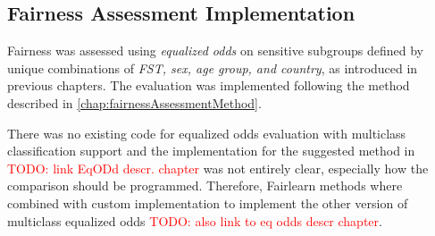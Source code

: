 \documentclass[12pt, a4paper, oneside]{book}   	%
\renewcommand{\todo}[1]{\textcolor{red}{TODO: #1}}
\begin{document}
		
		\subsection{Fairness Assessment Implementation} \label{chap:fairnessAssessmentImpementation}
		Fairness was assessed using \textit{equalized odds} on sensitive subgroups defined by unique combinations of \textit{\gls{FST}, sex, age group, and country}, as introduced in previous chapters. The evaluation was implemented following the method described in \autoref{chap:fairnessAssessmentMethod}.
		
		There was no existing code for equalized odds evaluation with multiclass classification support and the implementation for the suggested method in \todo{link EqODd descr. chapter} was not entirely clear, especially how the comparison should be programmed. Therefore, Fairlearn methods where combined with custom implementation to implement the other version of multiclass equalized odds \todo{also link to eq odds descr chapter}.
		
\end{document}
